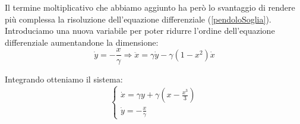 Il termine moltiplicativo che abbiamo aggiunto ha però lo svantaggio di rendere più complessa la risoluzione dell'equazione differenziale (\ref{pendoloSoglia}).\\

Introduciamo una nuova variabile per poter ridurre l'ordine dell'equazione differenziale aumentandone la dimensione:
\begin{equation*}
	\dot{y}=-\frac{x}{\gamma} \Rightarrow  \ddot{x}=\gamma \dot{y}-\gamma(1-x^2)\dot{x} 
\end{equation*}

Integrando otteniamo il sistema:
\begin{equation}
	\begin{cases}
		\dot{x}=\gamma y+\gamma(x-\frac{x^3}{3})\\
		\dot{y}=-\frac{x}{\gamma}
		\label{sistema}
	\end{cases}
\end{equation}

